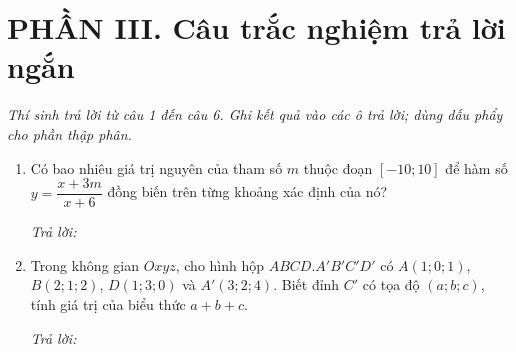 \documentclass[12pt,a4paper]{article}
\newcommand{\otraloi}{\par\nobreak\smallskip\noindent\textit{Trả lời:}\quad\fbox{\rule{0pt}{11pt}\makebox[0.3cm]{}}\,\fbox{\rule{0pt}{11pt}\makebox[0.3cm]{}}\,\fbox{\rule{0pt}{11pt}\makebox[0.3cm]{}}\,\fbox{\rule{0pt}{11pt}\makebox[0.3cm]{}}}
\begin{document}
\section*{\large PHẦN III. Câu trắc nghiệm trả lời ngắn}
\textit{Thí sinh trả lời từ câu 1 đến câu 6. Ghi kết quả vào các ô trả lời; dùng dấu phẩy cho phần thập phân.}
\begin{enumerate}
\item Có bao nhiêu giá trị nguyên của tham số $m$ thuộc đoạn $[-10;10]$ để hàm số $y=\dfrac{x+3m}{x+6}$ đồng biến trên từng khoảng xác định của nó?
\otraloi

\item Trong không gian $Oxyz$, cho hình hộp $ABCD.A'B'C'D'$ có $A(1;0;1)$, $B(2;1;2)$, $D(1;3;0)$ và $A'(3;2;4)$. Biết đỉnh $C'$ có tọa độ $(a;b;c)$, tính giá trị của biểu thức $a+b+c$.
\otraloi
\end{enumerate}
\end{document}
